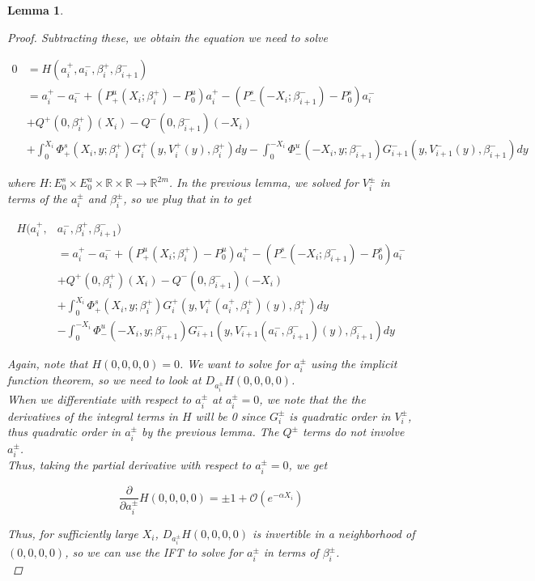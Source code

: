 \documentclass[12pt]{article}
\def\R{{\mathbb R}}
\newtheorem{lemma}{Lemma}
\begin{document}
\begin{lemma}
\begin{proof}
Subtracting these, we obtain the equation we need to solve

\begin{align*}
0 &= H(a_i^+, a_i^-, \beta_i^+, \beta_{i+1}^-) \\
&= a_i^+ - a_i^- + (P^u_+(X_i; \beta_i^+) -  P^u_0)a_i^+ - (P^s_-(-X_i; \beta_{i+1}^-) - P^s_0) a_i^-  \\
&+ Q^+(0, \beta_i^+)(X_i) - Q^-(0, \beta_{i+1}^-)(-X_i)\\
&+ \int_0^{X_i} \Phi_+^s(X_i, y; \beta_i^+) G_i^+(y, V_i^+(y),\beta_i^+)dy
- \int_0^{-X_i} \Phi_-^u(-X_i, y; \beta_{i+1}^-) G_{i+1}^-(y, V_{i+1}^-(y),\beta_{i+1}^-)dy 
\end{align*}

where $H: E_0^s \times E_0^u \times \R \times \R \rightarrow \R^{2m}$. In the previous lemma, we solved for $V_i^\pm$ in terms of the $a_i^\pm$ and $\beta_i^\pm$, so we plug that in to get

\begin{align*}
H(a_i^+, &a_i^-, \beta_i^+, \beta_{i+1}^-) \\
&= a_i^+ - a_i^- + (P^u_+(X_i; \beta_i^+) -  P^u_0)a_i^+ - (P^s_-(-X_i; \beta_{i+1}^-) - P^s_0) a_i^-  \\
&+ Q^+(0, \beta_i^+)(X_i) - Q^-(0, \beta_{i+1}^-)(-X_i)\\
&+ \int_0^{X_i} \Phi_+^s(X_i, y; \beta_i^+) G_i^+(y, V_i^+(a_i^+, \beta_i^+)(y),\beta_i^+)dy \\
&- \int_0^{-X_i} \Phi_-^u(-X_i, y; \beta_{i+1}^-) G_{i+1}^-(y, V_{i+1}^-(a_i^-, \beta_{i+1}^-)(y),\beta_{i+1}^-)dy 
\end{align*}

Again, note that $H(0, 0, 0, 0) = 0$. We want to solve for $a_i^\pm$ using the implicit function theorem, so we need to look at $D_{a_i^\pm} H(0, 0, 0, 0)$.\\

When we differentiate with respect to $a_i^\pm$ at $a_i^\pm = 0$, we note that the the derivatives of the integral terms in $H$ will be 0 since $G_i^\pm$ is quadratic order in $V_i^\pm$, thus quadratic order in $a_i^\pm$ by the previous lemma. The $Q^\pm$ terms do not involve $a_i^\pm$.\\

Thus, taking the partial derivative with respect to $a_i^\pm = 0$, we get

\[
\frac{\partial}{\partial a_i^\pm} H(0, 0, 0, 0) = \pm 1 + \mathcal{O} (e^{-\alpha X_i})
\]

Thus, for sufficiently large $X_i$, $D_{a_i^\pm} H(0, 0, 0, 0)$ is invertible in a neighborhood of $(0, 0, 0, 0)$, so we can use the IFT to solve for $a_i^\pm$ in terms of $\beta_i^\pm$. \\


\end{proof}
\end{lemma}
\end{document}
